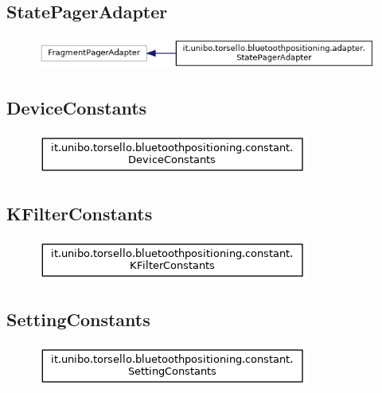 \subsection{StatePagerAdapter}
\begin{figure}[ph]
	\centering
	\includegraphics[scale=.55]{img/uml/inherit_graph/inherit_graph_3.png}
	\caption[]{}
\end{figure}

\newpage

\subsection{DeviceConstants}
\begin{figure}[ph]
	\centering
	\includegraphics[scale=.55]{img/uml/inherit_graph/inherit_graph_5.png}
	\caption[]{}
\end{figure}

\subsection{KFilterConstants}
\begin{figure}[ph]
	\centering
	\includegraphics[scale=.55]{img/uml/inherit_graph/inherit_graph_6.png}
	\caption[]{}
\end{figure}

\subsection{SettingConstants}
\begin{figure}[ph]
	\centering
	\includegraphics[scale=.55]{img/uml/inherit_graph/inherit_graph_7.png}
	\caption[]{}
\end{figure}

\newpage
